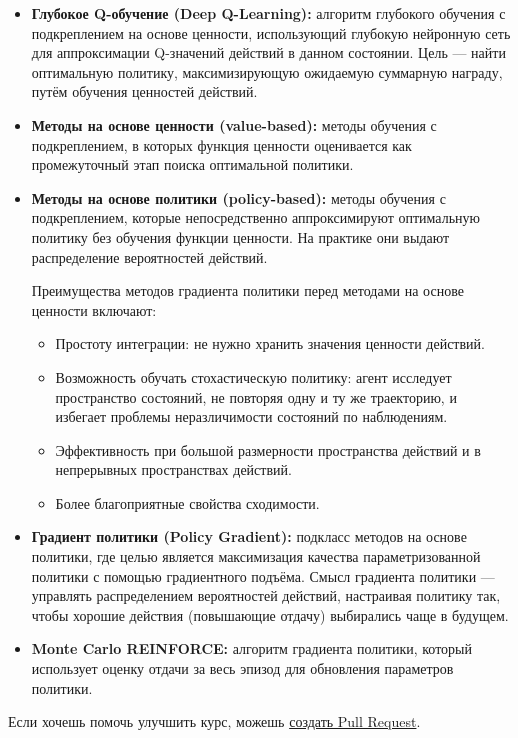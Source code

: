 \documentclass[11pt,a4paper]{article}
\begin{document}
\begin{itemize}
\item
  \textbf{Глубокое Q-обучение (Deep Q-Learning):} алгоритм глубокого обучения с подкреплением на основе ценности, использующий глубокую нейронную сеть для аппроксимации Q-значений действий в данном состоянии. Цель --- найти оптимальную политику, максимизирующую ожидаемую суммарную награду, путём обучения ценностей действий.
\item
  \textbf{Методы на основе ценности (value-based):} методы обучения с подкреплением, в которых функция ценности оценивается как промежуточный этап поиска оптимальной политики.
\item
  \textbf{Методы на основе политики (policy-based):} методы обучения с подкреплением, которые непосредственно аппроксимируют оптимальную политику без обучения функции ценности. На практике они выдают распределение вероятностей действий.

  Преимущества методов градиента политики перед методами на основе ценности включают:

  \begin{itemize}
  \tightlist
  \item
    Простоту интеграции: не нужно хранить значения ценности действий.
  \item
    Возможность обучать стохастическую политику: агент исследует пространство состояний, не повторяя одну и ту же траекторию, и избегает проблемы неразличимости состояний по наблюдениям.
  \item
    Эффективность при большой размерности пространства действий и в непрерывных пространствах действий.
  \item
    Более благоприятные свойства сходимости.
  \end{itemize}
\item
  \textbf{Градиент политики (Policy Gradient):} подкласс методов на основе политики, где целью является максимизация качества параметризованной политики с помощью градиентного подъёма. Смысл градиента политики --- управлять распределением вероятностей действий, настраивая политику так, чтобы хорошие действия (повышающие отдачу) выбирались чаще в будущем.
\item
  \textbf{Monte Carlo REINFORCE:} алгоритм градиента политики, который использует оценку отдачи за весь эпизод для обновления параметров политики.
\end{itemize}

Если хочешь помочь улучшить курс, можешь \href{https://github.com/huggingface/deep-rl-class/pulls}{создать Pull Request}.
\end{document}
